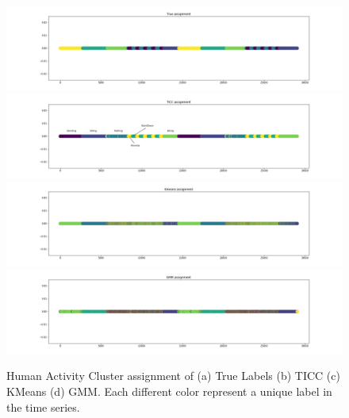 \documentclass{llncs}
\begin{document}
\begin{figure}[H]
    \centering
    \includegraphics[width=.49\textwidth]{True.png}
    \includegraphics[width=.49\textwidth]{TICC.png}
    \includegraphics[width=.49\textwidth]{KMeans.png}
    \includegraphics[width=.49\textwidth]{GMM.png}
    \caption{Human Activity Cluster assignment of (a) True Labels (b) TICC (c) KMeans (d) GMM. Each different color represent a unique label in the time series.}
    \label{fig:human}
\end{figure}
\end{document}
